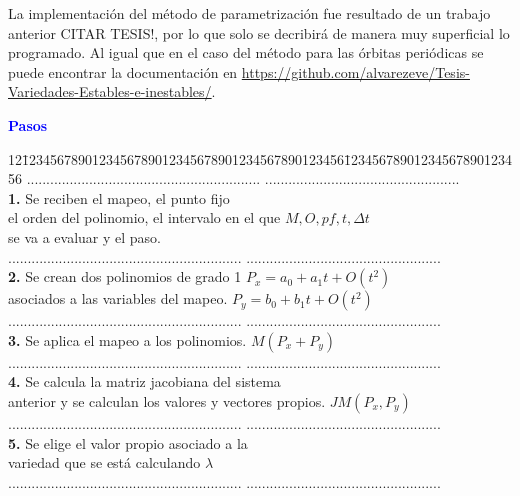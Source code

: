 La implementaci\'on del m\'etodo de parametrizaci\'on fue resultado de un trabajo anterior CITAR TESIS!, por lo que solo se decribir\'a de manera muy superficial lo programado. Al igual que en el caso del m\'etodo para las \'orbitas peri\'odicas se puede encontrar la documentaci\'on en \url{https://github.com/alvarezeve/Tesis-Variedades-Estables-e-inestables/}. 

\begin{center}
	\textcolor{blue}{\textbf{Pasos}}
	\begin{tabbing}
		12\=1234567890123456789012345678901234567890123456\=12345678901234567890123456\kill%
		\>............................................................  \>..................................................\\
		\>\textbf{1.} Se reciben el mapeo, el punto fijo  \> \\
		\> el orden del polinomio, el intervalo en el que \> $M, O, pf, t, \Delta t$\\
		\> se va a evaluar y el paso.\> \\
		\>............................................................  \>..................................................\\
		\>\textbf{2.} Se crean dos polinomios de grado 1  \> $P_{x} = a_{0}+a_{1}t+O(t^{2})$\\
		\> asociados a las variables del mapeo. \>  $P_{y} = b_{0} +b_{1}t+O(t^{2})$ \\
		\>............................................................  \>..................................................\\
		\>\textbf{3.} Se aplica el mapeo a los polinomios.  \> $M(P_{x}+P_{y})$\\
		\>............................................................  \>..................................................\\
		\>\textbf{4.} Se calcula la matriz jacobiana del sistema \> \\
		\>anterior y se calculan los valores y vectores propios.\> $JM(P_{x},P_{y})$\\
		\>............................................................  \>..................................................\\
		\>\textbf{5.} Se elige el valor propio asociado a la  \> \\
		\>variedad que se está calculando \> $\lambda$\\
		\>............................................................  \>..................................................\\

\end{tabbing}
\end{center}
